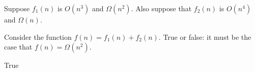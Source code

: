 \begin{prob}
    Suppose $f_1(n)$ is $O(n^3)$ and $\Omega(n^2)$. Also suppose that $f_2(n)$
    is $O(n^4)$ and $\Omega(n)$.

    Consider the function $f(n) = f_1(n) + f_2(n)$. True or false: it must be
    the case that $f(n) = \Omega(n^2)$.

    \Tf{}

    \begin{soln}
        True
    \end{soln}
\end{prob}
